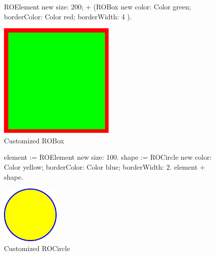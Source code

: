 \documentclass[a4paper,10pt,twoside]{book}
\begin{document}
\begin{figure}[H]
      \begin{minipage}[t]{0.5\textwidth}
      \vspace{0pt}
     \begin{code}{}
ROElement new 
	size: 200; 
	+ (ROBox new 
				color: Color green; 
				borderColor: Color red; 
				borderWidth: 4 ).	\end{code}
   \end{minipage}
   \hfill
   \begin{minipage}[t]{0.4\textwidth}
      \vspace{0pt} \raggedright
       \centering
		\includegraphics[width=0.5\textwidth]{box}
   \end{minipage}
\caption{Customized ROBox}
\label{fig:box}
\end{figure} 

\begin{figure}[H]
      \begin{minipage}[t]{0.5\textwidth}
      \vspace{0pt}
     \begin{code}{}
element := ROElement new 
				size: 100.
shape := ROCircle new 
			color: Color yellow; 
			borderColor: Color blue; 
			borderWidth: 2.
element + shape.	\end{code}
   \end{minipage}
   \hfill
   \begin{minipage}[t]{0.4\textwidth}
      \vspace{0pt} \raggedright
       \centering
		\includegraphics[width=0.25\textwidth]{circle}     
   \end{minipage}
\caption{Customized ROCircle}
\label{fig:circle}
\end{figure}
\end{document}
